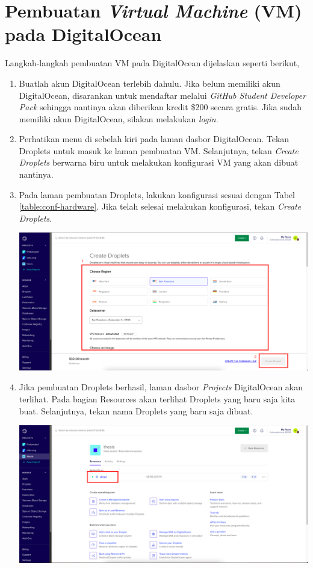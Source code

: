 \chapter{Pembuatan \textit{Virtual Machine} (VM) pada DigitalOcean}
\label{appendix:A}

Langkah-langkah pembuatan VM pada DigitalOcean dijelaskan seperti berikut,
\begin{enumerate}
  \item Buatlah akun DigitalOcean terlebih dahulu. Jika belum memiliki akun DigitalOcean, disarankan untuk mendaftar melalui \textit{GitHub Student Developer Pack} sehingga nantinya akan diberikan kredit \$200 secara gratis. Jika sudah memiliki akun DigitalOcean, silakan melakukan \textit{login}.
  \item Perhatikan menu di sebelah kiri pada laman dasbor DigitalOcean. Tekan Droplets untuk masuk ke laman pembuatan VM. Selanjutnya, tekan \textit{Create Droplets} berwarna biru untuk melakukan konfigurasi VM yang akan dibuat nantinya. 
  \item Pada laman pembuatan Droplets, lakukan konfigurasi sesuai dengan Tabel \ref{table:conf-hardware}. Jika telah selesai melakukan konfigurasi, tekan \textit{Create Droplets}. 
	\begin{center}
	\includegraphics[width=1\linewidth]{figures/ch99/ap1/3.png}
	\end{center} 
  \item Jika pembuatan Droplets berhasil, laman dasbor \textit{Projects} DigitalOcean akan terlihat. Pada bagian Resources akan terlihat Droplets yang baru saja kita buat. Selanjutnya, tekan nama Droplets yang baru saja dibuat. 
	\begin{center}
	\includegraphics[width=1\linewidth]{figures/ch99/ap1/4.png}

\end{center}
\end{enumerate}
